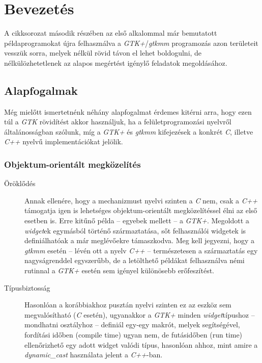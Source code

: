 \section{Bevezetés}

A cikksorozat második részében az első alkalommal már bemutatott példaprogramokat újra felhasználva a \textit{GTK+}/\textit{gtkmm} programozás azon területeit vesszük sorra, melyek nélkül rövid távon el lehet boldogulni, de nélkülözhetetlenek az alapos megértést igénylő feladatok megoldásához.

\subsection{Alapfogalmak}

Még mielőtt ismertetnénk néhány alapfogalmat érdemes kitérni arra, hogy ezen túl a \textit{GTK} rövidítést akkor használjuk, ha a felületprogramozási nyelvről általánosságban szólunk, míg a \textit{GTK+} és \textit{gtkmm} kifejezések a konkrét \textit{C}, illetve \textit{C++} nyelvű implementációkat jelölik.

\subsubsection{Objektum-orientált megközelítés}

\begin{description}
 \item[Öröklődés] Annak ellenére, hogy a mechanizmust nyelvi szinten a \textit{C} nem, csak a \textit{C++} támogatja igen is lehetséges objektum-orientált megközelítéssel élni az első esetben is. Erre kitűnő példa -- egyebek mellett -- a \textit{GTK+}. Megoldott a \textit{widget}ek egymásból történő származtatása, sőt felhasználói widgetek is definiálhatóak a már meglévőekre támaszkodva. Meg kell jegyezni, hogy a \textit{gtkmm} esetén -- lévén ott a nyelv \textit{C++} -- természetesen a származtatás egy nagyságrenddel egyszerűbb, de a letölthető példákat felhasználva némi rutinnal a \textit{GTK+} esetén sem igényel különösebb erőfeszítést.

 \item[Típusbiztosság] Hasonlóan a korábbiakhoz pusztán nyelvi szinten ez az eszköz sem megvalósítható (\textit{C} esetén), ugyanakkor a \textit{GTK+} minden \textit{widget}típushoz -- mondhatni osztályhoz -- definiál egy-egy makrót, melyek segítségével, fordítási időben (compile time) ugyan nem, de futásidőben (run time) ellenőrizhető egy adott widget valódi típus, hasonlóan ahhoz, mint amire a \textit{dynamic\_cast} használata jelent a \textit{C++}-ban.
\end{description}

